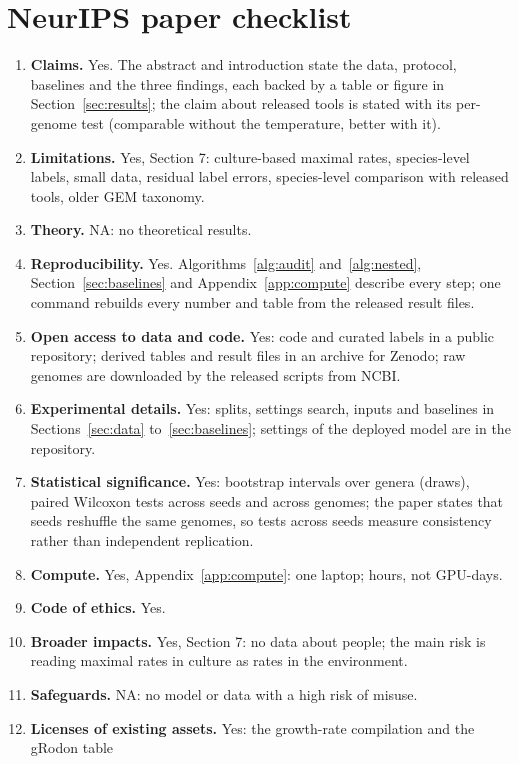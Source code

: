 \section*{NeurIPS paper checklist}
\begin{enumerate}
\item \textbf{Claims.} Yes. The abstract and introduction state the data, protocol, baselines and the three findings, each
backed by a table or figure in Section~\ref{sec:results}; the claim about released tools is stated with its per-genome test
(comparable without the temperature, better with it).
\item \textbf{Limitations.} Yes, Section 7: culture-based maximal rates, species-level labels, small data, residual label
errors, species-level comparison with released tools, older GEM taxonomy.
\item \textbf{Theory.} NA: no theoretical results.
\item \textbf{Reproducibility.} Yes. Algorithms~\ref{alg:audit} and~\ref{alg:nested}, Section~\ref{sec:baselines} and
Appendix~\ref{app:compute} describe every step; one command rebuilds every number and table from the released result files.
\item \textbf{Open access to data and code.} Yes: code and curated labels in a public repository; derived tables and result files in an
archive for Zenodo; raw genomes are downloaded by the released scripts from NCBI.
\item \textbf{Experimental details.} Yes: splits, settings search, inputs and baselines in Sections~\ref{sec:data}
to~\ref{sec:baselines}; settings of the deployed model are in the repository.
\item \textbf{Statistical significance.} Yes: bootstrap intervals over genera (\NBootDraws draws), paired Wilcoxon tests
across seeds and across genomes; the paper states that seeds reshuffle the same genomes, so tests across seeds measure
consistency rather than independent replication.
\item \textbf{Compute.} Yes, Appendix~\ref{app:compute}: one laptop; hours, not GPU-days.
\item \textbf{Code of ethics.} Yes.
\item \textbf{Broader impacts.} Yes, Section 7: no data about people; the main risk is reading maximal rates in culture as
rates in the environment.
\item \textbf{Safeguards.} NA: no model or data with a high risk of misuse.
\item \textbf{Licenses of existing assets.} Yes: the growth-rate compilation \citep{madin2020} and the gRodon table

\end{enumerate}
